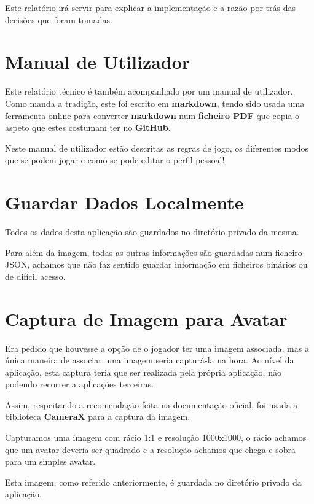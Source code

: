 \documentclass[11pt]{article}
\begin{document}
	Este relatório irá servir para explicar a implementação e a razão por trás das decisões que foram tomadas.
	
	
	\large
	\section{Manual de Utilizador}
	\normalsize
	
	Este relatório técnico é também acompanhado por um manual de utilizador. Como manda a tradição, este foi escrito em \textbf{markdown}, tendo sido usada uma ferramenta online para converter \textbf{markdown} num \textbf{ficheiro PDF} que copia o aspeto que estes costumam ter no \textbf{GitHub}.
	
	Neste manual de utilizador estão descritas as regras de jogo, os diferentes modos que se podem jogar e como se pode editar o perfil pessoal!
	
	
	\large
	\section{Guardar Dados Localmente}
	\normalsize
	
	Todos os dados desta aplicação são guardados no diretório privado da mesma. 
	
	Para além da imagem, todas as outras informações são guardadas num ficheiro JSON, achamos que não faz sentido guardar informação em ficheiros binários ou de difícil acesso.
	
	
	\large
	\section{Captura de Imagem para Avatar}
	\normalsize
	
	Era pedido que houvesse a opção de o jogador ter uma imagem associada, mas a única maneira de associar uma imagem seria capturá-la na hora. Ao nível da aplicação, esta captura teria que ser realizada pela própria aplicação, não podendo recorrer a aplicações terceiras.
	
	Assim, respeitando a recomendação feita na documentação oficial, foi usada a biblioteca \textbf{CameraX} para a captura da imagem.
	
	Capturamos uma imagem com rácio 1:1 e resolução 1000x1000, o rácio achamos que um avatar deveria ser quadrado e a resolução achamos que chega e sobra para um simples avatar.
	
	Esta imagem, como referido anteriormente, é guardada no diretório privado da aplicação.
	
\end{document}
